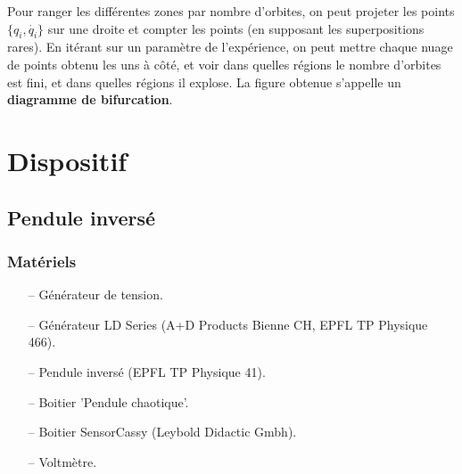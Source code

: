 \documentclass[a4paper,12pt,oneside]{article}
\begin{document}
Pour ranger les différentes zones par nombre d'orbites, on peut projeter les points $\{q_i,\dot {q_i}\}$ sur une droite et compter les points (en supposant les superpositions rares). En itérant sur un paramètre de l'expérience, on peut mettre chaque nuage de points obtenu les uns à côté, et voir dans quelles régions le nombre d'orbites est fini, et dans quelles régions il explose. La figure obtenue s'appelle un \textbf{diagramme de bifurcation}.



\section{Dispositif}
\subsection{Pendule inversé}

\subsubsection{Matériels}
\begin{itemize}
  \item[--] Générateur de tension.
  \item[--] Générateur LD Series (A+D Products Bienne CH, EPFL TP Physique 466).
  \item[--] Pendule inversé (EPFL TP Physique 41).
  \item[--] Boitier ’Pendule chaotique’.
  \item[--] Boitier SensorCassy (Leybold Didactic Gmbh).
  \item[--] Voltmètre.
\end{itemize}

\end{document}
